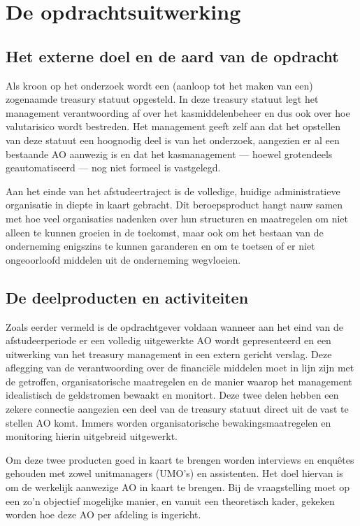 \documentclass[10pt,a4paper,twoside]{report}
\begin{document}
\chapter{De opdrachtsuitwerking}
\section{Het externe doel en de aard van de opdracht}
Als kroon op het onderzoek wordt een (aanloop tot het maken van een) zogenaamde treasury statuut opgesteld. In deze treasury statuut legt het management verantwoording af over het kasmiddelenbeheer en dus ook over hoe valutarisico wordt bestreden. Het management geeft zelf aan dat het opstellen van deze statuut een hoognodig deel is van het onderzoek, aangezien er al een bestaande AO aanwezig is en dat het kasmanagement --- hoewel grotendeels geautomatiseerd --- nog niet formeel is vastgelegd.

Aan het einde van het afstudeertraject is de volledige, huidige administratieve organisatie in diepte in kaart gebracht. Dit beroepsproduct hangt nauw samen met hoe veel organisaties nadenken over hun structuren en maatregelen om niet alleen te kunnen groeien in de toekomst, maar ook om het bestaan van de onderneming enigszins te kunnen garanderen en om te toetsen of er niet ongeoorloofd middelen uit de onderneming wegvloeien.

\section{De deelproducten en activiteiten}
Zoals eerder vermeld is de opdrachtgever voldaan wanneer aan het eind van de afstudeerperiode er een volledig uitgewerkte AO wordt gepresenteerd en een uitwerking van het treasury management in een extern gericht verslag. Deze aflegging van de verantwoording over de financiële middelen moet in lijn zijn met de getroffen, organisatorische maatregelen en de manier waarop het management idealistisch de geldstromen bewaakt en monitort. Deze twee delen hebben een zekere connectie aangezien een deel van de treasury statuut direct uit de vast te stellen AO komt. Immers worden organisatorische bewakingsmaatregelen en monitoring hierin uitgebreid uitgewerkt. 

Om deze twee producten goed in kaart te brengen worden interviews en enquêtes gehouden met zowel unitmanagers (UMO’s) en assistenten. Het doel hiervan is om de werkelijk aanwezige AO in kaart te brengen. Bij de vraagstelling moet op een zo’n objectief mogelijke manier, en vanuit een theoretisch kader, gekeken worden hoe deze AO per afdeling is ingericht.
\end{document}
